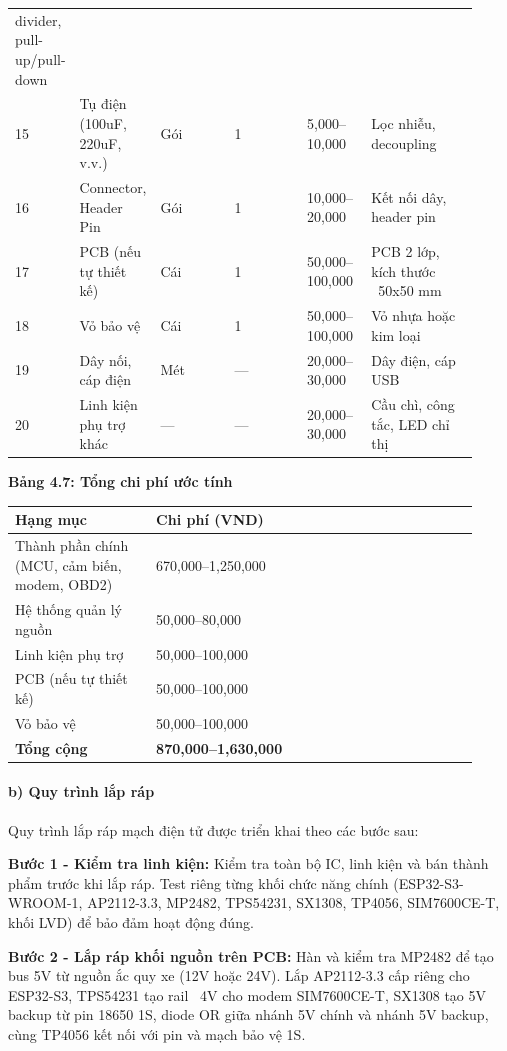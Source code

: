 \documentclass[13pt,a4paper]{extarticle}
\newcounter{none} %
\newcommand{\thesislongtableorignewline}{}
\let\thesislongtableorignewline\\
\renewcommand{\\}{\thesislongtableorignewline\hline}%
\let\\\thesislongtableorignewline
\newcommand{\thesistabletitle}[1]{%
  \begin{center}\textbf{#1}\end{center}%
}
\begin{document}
{\begin{longtable}{|p{0.06\linewidth}|p{0.14\linewidth}|p{0.17\linewidth}|p{0.17\linewidth}|p{0.14\linewidth}|p{0.24\linewidth}|}
divider, pull-up/pull-down \\
15 & Tụ điện (100uF, 220uF, v.v.) & Gói & 1 & 5,000--10,000 & Lọc nhiễu,
decoupling \\
16 & Connector, Header Pin & Gói & 1 & 10,000--20,000 & Kết nối dây,
header pin \\
17 & PCB (nếu tự thiết kế) & Cái & 1 & 50,000--100,000 & PCB 2 lớp, kích
thước ~50x50 mm \\
18 & Vỏ bảo vệ & Cái & 1 & 50,000--100,000 & Vỏ nhựa hoặc kim loại \\
19 & Dây nối, cáp điện & Mét & --- & 20,000--30,000 & Dây điện, cáp
USB \\
20 & Linh kiện phụ trợ khác & --- & --- & 20,000--30,000 & Cầu chì, công
tắc, LED chỉ thị \\
\end{longtable}
}

\thesistabletitle{Bảng 4.7: Tổng chi phí ước tính}

{\def\LTcaptype{none} %
\begin{longtable}{|p{0.28\linewidth}|p{0.64\linewidth}|}
\hline \textbf{Hạng mục} & \textbf{Chi phí (VND)} \\
\hline
\endhead
\hline
\endlastfoot
Thành phần chính (MCU, cảm biến, modem, OBD2) & 670,000--1,250,000 \\
Hệ thống quản lý nguồn & 50,000--80,000 \\
Linh kiện phụ trợ & 50,000--100,000 \\
PCB (nếu tự thiết kế) & 50,000--100,000 \\
Vỏ bảo vệ & 50,000--100,000 \\
\textbf{Tổng cộng} & \textbf{870,000--1,630,000} \\
\end{longtable}
}

\paragraph{b) Quy trình lắp ráp}\label{b-quy-truxecnh-lux1eafp-ruxe1p}

Quy trình lắp ráp mạch điện tử được triển khai theo các bước sau:

\textbf{Bước 1 - Kiểm tra linh kiện:} Kiểm tra toàn bộ IC, linh kiện và
bán thành phẩm trước khi lắp ráp. Test riêng từng khối chức năng chính
(ESP32-S3-WROOM-1, AP2112-3.3, MP2482, TPS54231, SX1308, TP4056,
SIM7600CE-T, khối LVD) để bảo đảm hoạt động đúng.

\textbf{Bước 2 - Lắp ráp khối nguồn trên PCB:} Hàn và kiểm tra MP2482 để
tạo bus 5V từ nguồn ắc quy xe (12V hoặc 24V). Lắp AP2112-3.3 cấp riêng
cho ESP32-S3, TPS54231 tạo rail ~4V cho modem SIM7600CE-T,
SX1308 tạo 5V backup từ pin 18650 1S, diode OR giữa nhánh 5V chính và
nhánh 5V backup, cùng TP4056 kết nối với pin và mạch bảo vệ 1S.
\end{document}
